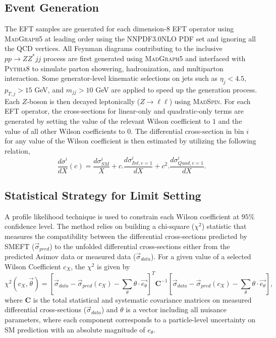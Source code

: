 \subsection{Event Generation}
\label{subsec:EFT_EventGen}
The EFT samples are generated for each dimension-8 EFT operator using \textsc{MadGraph5} at leading order using the NNPDF3.0NLO PDF set and ignoring all the QCD vertices.
All Feynman diagrams contributing to the inclusive $pp \rightarrow ZZ^* jj$ process are first generated using \textsc{MadGraph5} and interfaced with \textsc{Pythia8} to simulate parton showering, hadronization, and multiparton interaction. Some generator-level kinematic selections on jets such as $\eta_{j}<4.5$, $p_{T,j} > 15$ GeV, and $m_{jj} > 10$ GeV are applied to speed up the generation process. Each $Z$-boson is then decayed leptonically ($Z\rightarrow \ell \ell$) using \textsc{MadSpin}. For each EFT operator, the cross-sections for linear-only and quadratic-only terms are generated by setting the value of the relevant Wilson coefficient to $1$ and the value of all other Wilson coefficients to $0$. The differential cross-section in bin $i$ for any value of the Wilson coefficient is then estimated by utilizing the following relation,
\begin{equation}
\frac{d\sigma ^{i}}{dX}(c) = \frac{d\sigma ^{i}_{SM}}{X} + c . \frac{d\sigma ^{i}_{Int, c=1}}{dX} + c^2 . \frac{d\sigma ^{i}_{Quad, c=1}}{dX}.
\label{eqn:DiffxS_EFT}
\end{equation}

\subsection{Statistical Strategy for Limit Setting}
\label{subsec:EFT_Method}
A profile likelihood technique \cite{ProfileLikelihood} is used to constrain each Wilson coefficient at $95\%$ confidence level. The method relies on building a chi-square ($\chi^2$) statistic that measures the compatibility between the differential cross-sections predicted by SMEFT ($\vec{\sigma}_{pred}$) to the unfolded differential cross-sections either from the predicted Asimov data or measured data ($\vec{\sigma}_{data}$). For a given value of a selected Wilson Coefficient $c_X$, the $\chi^2$ is given by
\begin{equation}
    \chi^2(c_X, \vec{\theta}) = [\vec{\sigma}_{data} - \vec{\sigma}_{pred}(c_X)- \sum_{\theta}\theta\cdot\vec{e_\theta} ]^T \textbf{C}^{-1}[\vec{\sigma}_{data}  - \vec{\sigma}_{pred}(c_X) - \sum_{\theta}\theta\cdot\vec{e_\theta}],
    \label{eq:eftchi2}
\end{equation} 
where $\textbf{C}$ is the total statistical and systematic covariance matrices on measured differential cross-sections ($\vec{\sigma}_{data}$) and $\theta$ is a vector including all nuisance parameters, where each component corresponds to a particle-level uncertainty on SM prediction with an absolute magnitude of $e_{\theta}$.

